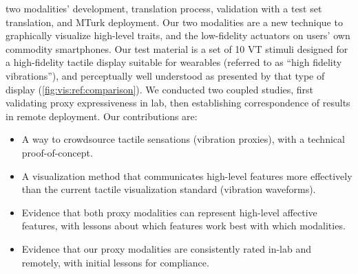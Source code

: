           
      
    two modalities' development,  translation process, validation with a test set translation, and MTurk deployment.  
    Our two modalities are a new  technique to graphically visualize high-level traits, and the low-fidelity actuators on users' own commodity smartphones. 
    Our test material is a set of 10 VT stimuli designed for a high-fidelity tactile display suitable for wearables (referred to as ``high fidelity vibrations''), and perceptually well understood as presented by that type of display  (\autoref{fig:vis:ref:comparison}).  
    We conducted two coupled studies, first validating proxy expressiveness in  lab, then establishing correspondence of results in remote deployment.
%
    Our contributions are:
    \begin{itemize}
    \setlength\itemsep{0px}
        \item  A way to crowdsource tactile sensations (vibration proxies), with a technical proof-of-concept.
        \item A visualization method that communicates high-level  features more effectively than the current tactile visualization standard (vibration waveforms).
        \item Evidence that both proxy modalities can represent high-level affective features, with lessons about which features work best with which modalities.
        \item Evidence that our proxy modalities are consistently rated in-lab and remotely, with initial lessons for compliance.  
    \end{itemize}
 
